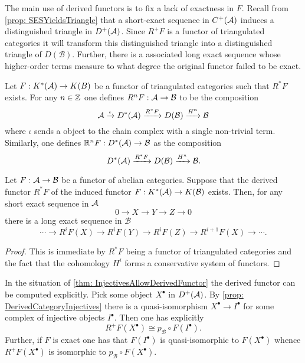 The main use of derived functors is to fix a lack of exactness in $F$.
Recall from \cref{prop: SESYieldsTriangle} that a short-exact sequence in $C^+(\AA)$ induces a distinguished triangle in $D^+(\AA)$.
Since $R^+F$ is a functor of triangulated categories it will transform this distinguished triangle into a distinguished triangle of $D(\mathcal{B})$.
Further, there is a associated long exact sequence whose higher-order terms measure to what degree the original functor failed to be exact.
\begin{definition}
 Let $F:K^*(\AA) \to K(B)$ be a functor of triangulated categories such that $R^*F$ exists.
 For any $n\in \Z$ one defines $R^nF:\AA \to \mathcal{B}$ to be the composition
 $$\AA\xrightarrow{\iota} D^*(\AA) \xrightarrow{R^*F} D(\mathcal{B}) \xrightarrow{H^n} \mathcal{B} $$
 where $\iota$ sends a object to the chain complex with a single non-trivial term.
 Similarly, one defines $\mathbb{R}^nF:D^*(\AA)\to \mathcal{B}$ as the composition
 $$D^*(\AA) \xrightarrow{R^*F} D(\mathcal{B}) \xrightarrow{H^n} \mathcal{B}. $$
\end{definition}
\begin{proposition}
   Let $F:\AA\to \mathcal{B}$ be a functor of abelian categories.
   Suppose that the derived functor $R^*F$ of the induced functor $F:K^*(\AA)\to K(\mathcal{B})$ exists.
   Then, for any short exact sequence in $\AA$
   $$0\to X \to Y \to Z \to 0 $$
   there is a long exact sequence in $\mathcal{B}$
   $$ \cdots \to R^{i}F(X)\to R^{i}F(Y) \to R^iF(Z) \to R^{i+1}F(X)\to \cdots. $$
\end{proposition}
\begin{proof}
  This is immediate by $R^*F$ being a functor of triangulated categories and the fact that the cohomology $H^i$ forms a conservative system of functors.
\end{proof}
In the situation of \cref{thm: InjectivesAllowDerivedFunctor} the derived functor can be computed explicitly.
Pick some object $X^\bullet$ in $D^+(\AA)$.
By \cref{prop: DerivedCategoryInjectives} there is a quasi-isomorphism $X^\bullet\to I^\bullet$ for some complex of injective objects $I^\bullet$.
Then one has explicitly
$$R^+F(X^\bullet) \cong p_\mathcal{B} \circ F(I^\bullet). $$
Further, if $F$ is exact one has that $F(I^\bullet)$ is quasi-isomorphic to $F(X^\bullet)$ whence $R^+F(X^\bullet)$ is isomorphic to $p_\mathcal{B}\circ F(X^\bullet)$.

